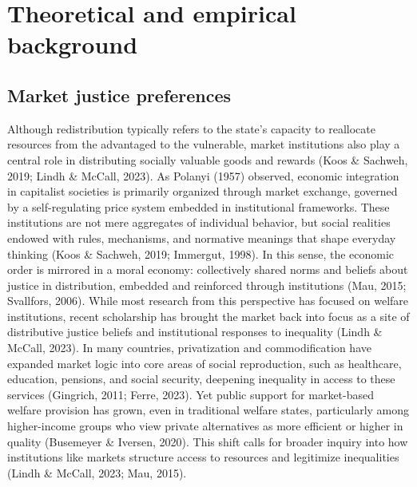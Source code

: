 \documentclass[
  12pt,
]{article}
\begin{document}
\section{Theoretical and empirical
background}\label{theoretical-and-empirical-background}

\subsection{Market justice
preferences}\label{market-justice-preferences}

Although redistribution typically refers to the state's capacity to
reallocate resources from the advantaged to the vulnerable, market
institutions also play a central role in distributing socially valuable
goods and rewards (Koos \& Sachweh, 2019; Lindh \& McCall, 2023). As
Polanyi (1957) observed, economic integration in capitalist societies is
primarily organized through market exchange, governed by a
self-regulating price system embedded in institutional frameworks. These
institutions are not mere aggregates of individual behavior, but social
realities endowed with rules, mechanisms, and normative meanings that
shape everyday thinking (Koos \& Sachweh, 2019; Immergut, 1998). In this
sense, the economic order is mirrored in a moral economy: collectively
shared norms and beliefs about justice in distribution, embedded and
reinforced through institutions (Mau, 2015; Svallfors, 2006). While most
research from this perspective has focused on welfare institutions,
recent scholarship has brought the market back into focus as a site of
distributive justice beliefs and institutional responses to inequality
(Lindh \& McCall, 2023). In many countries, privatization and
commodification have expanded market logic into core areas of social
reproduction, such as healthcare, education, pensions, and social
security, deepening inequality in access to these services (Gingrich,
2011; Ferre, 2023). Yet public support for market-based welfare
provision has grown, even in traditional welfare states, particularly
among higher-income groups who view private alternatives as more
efficient or higher in quality (Busemeyer \& Iversen, 2020). This shift
calls for broader inquiry into how institutions like markets structure
access to resources and legitimize inequalities (Lindh \& McCall, 2023;
Mau, 2015).
\end{document}
